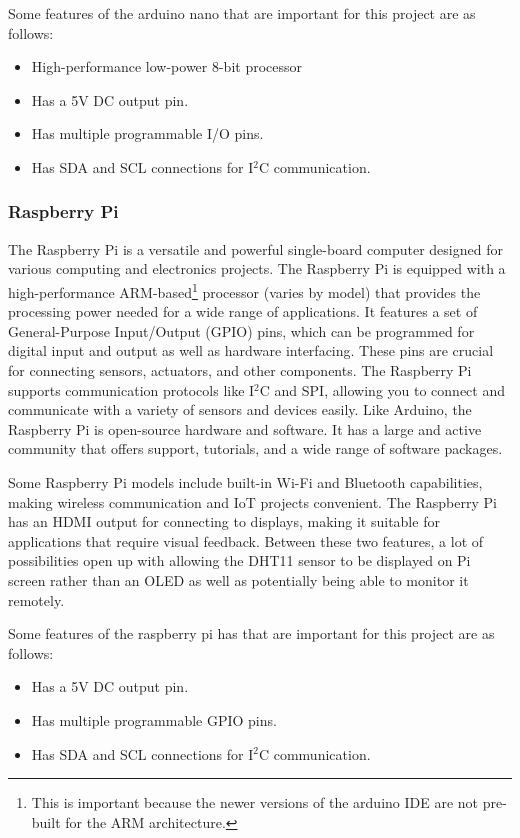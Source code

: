 \documentclass{article}
\begin{document}
\begin{multicols}{2}
		Some features of the arduino nano that are important for this project are as follows:
		\begin{itemize}[itemsep=1pt, parsep=1pt]
			\item High-performance low-power 8-bit processor
			\item Has a 5V DC output pin.
			\item Has multiple programmable I/O pins.
			\item Has SDA and SCL connections for I$^2$C communication.
		\end{itemize}
		
		\subsubsection{Raspberry Pi}
		
		The Raspberry Pi is a versatile and powerful single-board computer designed for various computing and electronics projects. The Raspberry Pi is equipped with a high-performance ARM-based\footnote{This is important because the newer versions of the arduino IDE are not pre-built for the ARM architecture.} processor (varies by model) that provides the processing power needed for a wide range of applications. It features a set of General-Purpose Input/Output (GPIO) pins, which can be programmed for digital input and output as well as hardware interfacing. These pins are crucial for connecting sensors, actuators, and other components. The Raspberry Pi supports communication protocols like I$^2$C and SPI, allowing you to connect and communicate with a variety of sensors and devices easily. Like Arduino, the Raspberry Pi is open-source hardware and software. It has a large and active community that offers support, tutorials, and a wide range of software packages.
		
		Some Raspberry Pi models include built-in Wi-Fi and Bluetooth capabilities, making wireless communication and IoT projects convenient. The Raspberry Pi has an HDMI output for connecting to displays, making it suitable for applications that require visual feedback. Between these two features, a lot of possibilities open up with allowing the DHT11 sensor to be displayed on Pi screen rather than an OLED as well as potentially being able to monitor it remotely.
		
		Some features of the raspberry pi has that are important for this project are as follows:
		\begin{itemize}[itemsep=1pt, parsep=1pt]
			\item Has a 5V DC output pin.
			\item Has multiple programmable GPIO pins.
			\item Has SDA and SCL connections for I$^2$C communication.
		\end{itemize}
		

\end{multicols}
\end{document}
